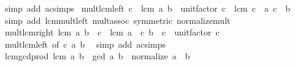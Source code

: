 \begin{isabellebody}
\ {\isacharparenleft}{\kern0pt}simp\ add{\isacharcolon}{\kern0pt}\ ac{\isacharunderscore}{\kern0pt}simps{\isacharparenright}{\kern0pt}%
\endisatagproof
{\isafoldproof}%
%
\isadelimproof
\isanewline
%
\endisadelimproof
\isanewline
{}\isamarkupfalse%
\ mult{\isacharunderscore}{\kern0pt}lcm{\isacharunderscore}{\kern0pt}left{\isacharcolon}{\kern0pt}\ {\isachardoublequoteopen}c\ {\isacharasterisk}{\kern0pt}\ lcm\ a\ b\ {\isacharequal}{\kern0pt}\ unit{\isacharunderscore}{\kern0pt}factor\ c\ {\isacharasterisk}{\kern0pt}\ lcm\ {\isacharparenleft}{\kern0pt}c\ {\isacharasterisk}{\kern0pt}\ a{\isacharparenright}{\kern0pt}\ {\isacharparenleft}{\kern0pt}c\ {\isacharasterisk}{\kern0pt}\ b{\isacharparenright}{\kern0pt}{\isachardoublequoteclose}\isanewline
%
\isadelimproof
\ \ %
\endisadelimproof
%
\isatagproof
{}\isamarkupfalse%
\ {\isacharparenleft}{\kern0pt}simp\ add{\isacharcolon}{\kern0pt}\ lcm{\isacharunderscore}{\kern0pt}mult{\isacharunderscore}{\kern0pt}left\ mult{\isachardot}{\kern0pt}assoc\ {\isacharbrackleft}{\kern0pt}symmetric{\isacharbrackright}{\kern0pt}\ normalize{\isacharunderscore}{\kern0pt}mult{\isacharparenright}{\kern0pt}%
\endisatagproof
{\isafoldproof}%
%
\isadelimproof
\isanewline
%
\endisadelimproof
\isanewline
{}\isamarkupfalse%
\ mult{\isacharunderscore}{\kern0pt}lcm{\isacharunderscore}{\kern0pt}right{\isacharcolon}{\kern0pt}\ {\isachardoublequoteopen}lcm\ a\ b\ {\isacharasterisk}{\kern0pt}\ c\ {\isacharequal}{\kern0pt}\ lcm\ {\isacharparenleft}{\kern0pt}a\ {\isacharasterisk}{\kern0pt}\ c{\isacharparenright}{\kern0pt}\ {\isacharparenleft}{\kern0pt}b\ {\isacharasterisk}{\kern0pt}\ c{\isacharparenright}{\kern0pt}\ {\isacharasterisk}{\kern0pt}\ unit{\isacharunderscore}{\kern0pt}factor\ c{\isachardoublequoteclose}\isanewline
%
\isadelimproof
\ \ %
\endisadelimproof
%
\isatagproof
{}\isamarkupfalse%
\ mult{\isacharunderscore}{\kern0pt}lcm{\isacharunderscore}{\kern0pt}left\ {\isacharbrackleft}{\kern0pt}of\ c\ a\ b{\isacharbrackright}{\kern0pt}\ \isamarkupfalse%
\ {\isacharparenleft}{\kern0pt}simp\ add{\isacharcolon}{\kern0pt}\ ac{\isacharunderscore}{\kern0pt}simps{\isacharparenright}{\kern0pt}%
\endisatagproof
{\isafoldproof}%
%
\isadelimproof
\isanewline
%
\endisadelimproof
\isanewline
{}\isamarkupfalse%
\ lcm{\isacharunderscore}{\kern0pt}gcd{\isacharunderscore}{\kern0pt}prod{\isacharcolon}{\kern0pt}\ {\isachardoublequoteopen}lcm\ a\ b\ {\isacharasterisk}{\kern0pt}\ gcd\ a\ b\ {\isacharequal}{\kern0pt}\ normalize\ {\isacharparenleft}{\kern0pt}a\ {\isacharasterisk}{\kern0pt}\ b{\isacharparenright}{\kern0pt}{\isachardoublequoteclose}\isanewline

\end{isabellebody}
